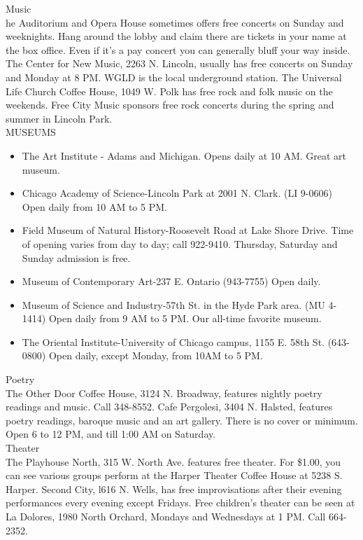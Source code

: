 \documentclass[11pt,twoside,a4paper]{book}
\begin{document}
Music~\\
he Auditorium and Opera House sometimes offers free concerts on Sunday and weeknights. Hang around the lobby and claim there are tickets in your name at the box office. Even if it's a pay concert you can generally bluff your way inside. The Center for New Music, 2263 N. Lincoln, usually has free concerts on Sunday and Monday at 8 PM. WGLD is the local underground station. The Universal Life Church Coffee House, 1049 W. Polk has free rock and folk music on the weekends. Free City Music sponsors free rock concerts during the  spring and summer in Lincoln Park.~\\

MUSEUMS
\begin{itemize}
\item The Art Institute - Adams and Michigan. Opens daily at 10 AM. Great art museum. 
\item Chicago Academy of Science-Lincoln Park at 2001 N. Clark. (LI 9-0606) Open daily from 10 AM to 5 PM. 
\item Field Museum of Natural History-Roosevelt Road at Lake Shore Drive. Time of opening varies from day to day; call 922-9410. Thursday, Saturday and Sunday admission is free. 
\item Museum of Contemporary Art-237 E. Ontario (943-7755) Open daily. 
\item Museum of Science and Industry-57th St. in the Hyde Park area. (MU 4-1414) Open daily from 9 AM to 5 PM. Our all-time favorite museum. 
\item The Oriental Institute-University of Chicago campus, 1155 E. 58th St. (643-0800) Open daily, except Monday, from 10AM to 5 PM.
\end{itemize}

Poetry~\\
The Other Door Coffee House, 3124 N. Broadway, features nightly poetry readings and music. Call 348-8552. Cafe Pergolesi, 3404 N. Halsted, features poetry readings, baroque music and an art gallery. There is no cover or minimum. Open 6 to 12 PM, and till 1:00 AM on Saturday.~\\

Theater~\\
The Playhouse North, 315 W. North Ave. features free theater. For \$1.00, you can see various groups perform at the Harper Theater Coffee House at 5238 S. Harper. Second City, l616 N. Wells, has free improvisations after their evening performances every evening except Fridays. Free children's theater can be seen at La Dolores, 1980 North Orchard, Mondays and Wednesdays at 1 PM. Call 664-2352.~\\
\end{document}
